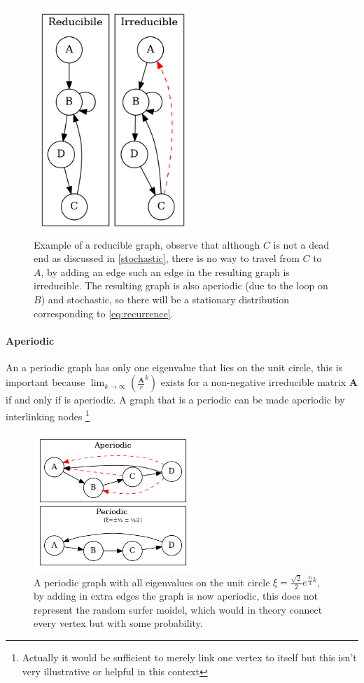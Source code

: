 \documentclass[11pt]{article}
\begin{document}
\begin{figure}[htbp]
\centering
\includegraphics[width=6cm]{media/dot/reducible_graph_example.dot.png}
\caption{\label{irreducible-example}Example of a reducible graph, observe that although \(C\) is not a dead end as discussed in \ref{stochastic}, there is no way to travel from \(C\) to \(A\), by adding an edge such an edge in the resulting graph is irreducible. The resulting graph is also aperiodic (due to the loop on \(B\)) and stochastic, so there will be a stationary distribution corresponding to \eqref{eq:recurrence}.}
\end{figure}

\paragraph{Aperiodic}
\label{sec:org5bcd84b}
An a periodic graph has only one eigenvalue that lies on the unit circle, this is important because \(\lim_{k\rightarrow \infty} \left( \frac{\mathbf{A}}{r}^{k} \right)\) exists for a non-negative irreducible matrix \(\mathbf{A}\) if and only if  is aperiodic. A graph that is a periodic can be made aperiodic by interlinking nodes \footnote{Actually it would be sufficient to merely link one vertex to itself \cite[]{langvilleGooglePageRankScience2012} but this isn't very illustrative or helpful in this context}


\begin{figure}[htbp]
\centering
\includegraphics[width=6cm]{media/dot/aperiodic.dot.png}
\caption{\label{fig:aperiodic}A periodic graph with all eigenvalues on the unit circle \(\xi = \frac{\sqrt{2}}{2} e^{\frac{\pi i}{4} k}\), by adding in extra edges the graph is now aperiodic, this does not represent the random surfer moidel, which would in theory connect every vertex but with some probability.}
\end{figure}
\end{document}
